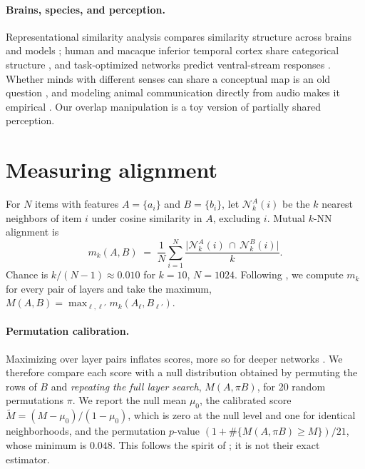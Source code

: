 \documentclass[11pt]{article}
\begin{document}
\paragraph{Brains, species, and perception.} Representational similarity analysis compares similarity structure across brains and models \citep{kriegeskorte2008rsa}; human and macaque inferior temporal cortex share categorical structure \citep{kriegeskorte2008matching}, and task-optimized networks predict ventral-stream responses \citep{yamins2016goal}. Whether minds with different senses can share a conceptual map is an old question \citep{nagel1974bat}, and modeling animal communication directly from audio makes it empirical \citep{andreas2022whales}. Our overlap manipulation is a toy version of partially shared perception.

\section{Measuring alignment}
\label{sec:metric}

For $N$ items with features $A=\{a_i\}$ and $B=\{b_i\}$, let $\mathcal{N}^A_k(i)$ be the $k$ nearest neighbors of item $i$ under cosine similarity in $A$, excluding $i$. Mutual $k$-NN alignment \citep{huh2024platonic} is
\begin{equation}
  m_k(A,B) \;=\; \frac{1}{N}\sum_{i=1}^{N} \frac{\lvert \mathcal{N}^A_k(i)\,\cap\,\mathcal{N}^B_k(i)\rvert}{k}.
\end{equation}
Chance is $k/(N-1)\approx 0.010$ for $k=10$, $N=1024$. Following \citet{huh2024platonic}, we compute $m_k$ for every pair of layers and take the maximum, $M(A,B)=\max_{\ell,\ell'} m_k(A_\ell,B_{\ell'})$.

\paragraph{Permutation calibration.} Maximizing over layer pairs inflates scores, more so for deeper networks \citep{groger2026aristotelian}. We therefore compare each score with a null distribution obtained by permuting the rows of $B$ and \emph{repeating the full layer search}, $M(A,\pi B)$, for 20 random permutations $\pi$. We report the null mean $\mu_0$, the calibrated score $\tilde M = (M-\mu_0)/(1-\mu_0)$, which is zero at the null level and one for identical neighborhoods, and the permutation $p$-value $(1+\#\{M(A,\pi B)\geq M\})/21$, whose minimum is $0.048$. This follows the spirit of \citet{groger2026aristotelian}; it is not their exact estimator.
\end{document}
